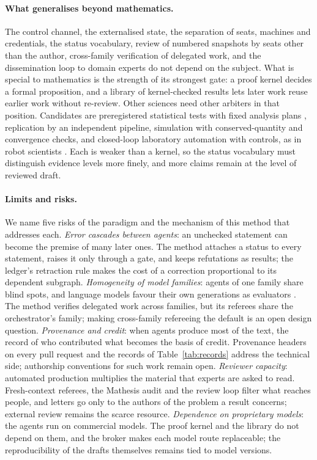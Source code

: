 \documentclass[11pt]{article}
\begin{document}
\paragraph{What generalises beyond mathematics.} The control channel, the
externalised state, the separation of seats, machines and credentials, the
status vocabulary, review of numbered snapshots by seats other than the
author, cross-family verification of delegated work, and the dissemination
loop to domain experts do not depend on the subject. What is special to
mathematics is the strength of its strongest gate: a proof kernel decides a
formal proposition, and a library of kernel-checked results lets later work
reuse earlier work without re-review. Other sciences need other arbiters in
that position. Candidates are preregistered statistical tests with fixed
analysis plans \citep{nosek}, replication by an independent pipeline,
simulation with conserved-quantity and convergence checks, and closed-loop
laboratory automation with controls, as in robot scientists \citep{king}.
Each is weaker than a kernel, so the status vocabulary must distinguish
evidence levels more finely, and more claims remain at the level of reviewed
draft.

\paragraph{Limits and risks.} We name five risks of the paradigm and the
mechanism of this method that addresses each.
\emph{Error cascades between agents}: an unchecked statement can become the
premise of many later ones. The method attaches a status to every statement,
raises it only through a gate, and keeps refutations as results; the ledger's
retraction rule makes the cost of a correction proportional to its dependent
subgraph.
\emph{Homogeneity of model families}: agents of one family share blind spots,
and language models favour their own generations as evaluators
\citep{panickssery,huang}. The method verifies delegated work across families,
but its referees share the orchestrator's family; making cross-family
refereeing the default is an open design question.
\emph{Provenance and credit}: when agents produce most of the text, the
record of who contributed what becomes the basis of credit. Provenance headers
on every pull request and the records of Table~\ref{tab:records} address the
technical side; authorship conventions for such work remain open.
\emph{Reviewer capacity}: automated production multiplies the material that
experts are asked to read. Fresh-context referees, the Mathesis audit and the
review loop filter what reaches people, and letters go only to the authors of
the problem a result concerns; external review remains the scarce resource.
\emph{Dependence on proprietary models}: the agents run on commercial models.
The proof kernel and the library do not depend on them, and the broker makes
each model route replaceable; the reproducibility of the drafts themselves
remains tied to model versions.
\end{document}
